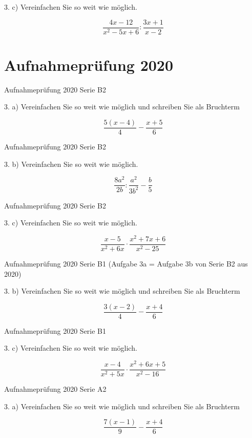 3. c) Vereinfachen Sie so weit wie möglich.

$$\frac{4x-12}{x^2-5x+6} : \frac{3x+1}{x-2}$$

\section*{Aufnahmeprüfung 2020}
Aufnahmeprüfung 2020 Serie B2

3. a) Vereinfachen Sie so weit wie möglich und schreiben Sie als Bruchterm

$$\frac{5(x-4)}{4} - \frac{x+5}{6}$$

Aufnahmeprüfung 2020 Serie B2

3. b) Vereinfachen Sie so weit wie möglich.

$$\frac{8a^2}{2b} : \frac{a^2}{3b^2} - \frac{b}{5}$$

Aufnahmeprüfung 2020 Serie B2

3. c) Vereinfachen Sie so weit wie möglich.

$$\frac{x-5}{x^2+6x} \cdot{} \frac{x^2+7x+6}{x^2-25}$$

Aufnahmeprüfung 2020 Serie B1
(Aufgabe 3a = Aufgabe 3b von Serie B2 aus 2020)

3. b) Vereinfachen Sie so weit wie möglich und schreiben Sie als Bruchterm

$$\frac{3(x-2)}{4} - \frac{x+4}{6}$$

Aufnahmeprüfung 2020 Serie B1

3. c) Vereinfachen Sie so weit wie möglich.

$$\frac{x-4}{x^2+5x} \cdot{} \frac{x^2+6x+5}{x^2-16}$$

Aufnahmeprüfung 2020 Serie A2

3. a) Vereinfachen Sie so weit wie möglich und schreiben Sie als Bruchterm

$$\frac{7(x-1)}{9} - \frac{x+4}{6}$$


